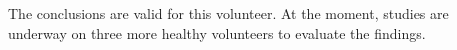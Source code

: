 \documentclass[conference]{IEEEtran}
\begin{document}
The conclusions are valid for this volunteer. At the moment, studies are
underway on three more healthy volunteers to evaluate the findings.





\vspace{12pt}
\end{document}
